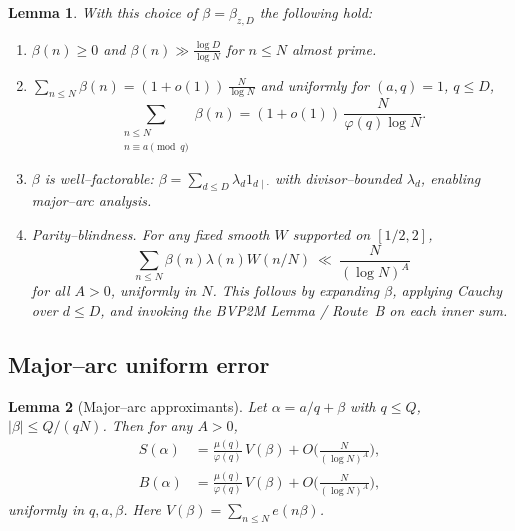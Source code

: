 \documentclass[11pt]{article}
\newtheorem{lemma}{Lemma}[part]
\theoremstyle{definition}
\theoremstyle{remark}
\numberwithin{equation}{part}
\begin{document}
\begin{lemma}\label{lem:beta-properties}
	With this choice of $\beta=\beta_{z,D}$ the following hold:
	\begin{enumerate}[label=(B\arabic*)]
		\item $\beta(n)\ge 0$ and $\beta(n)\gg \frac{\log D}{\log N}$ for $n\le N$ almost prime.
		\item $\sum_{n\le N}\beta(n)=(1+o(1))\,\tfrac{N}{\log N}$ and uniformly for $(a,q)=1$, $q\le D$,
		      \[
			      \sum_{\substack{n\le N\\ n\equiv a\pmod q}}\beta(n)
			      =(1+o(1))\,\frac{N}{\varphi(q)\log N}.
		      \]
		\item $\beta$ is well--factorable: $\beta=\sum_{d\le D}\lambda_d 1_{d\mid\cdot}$ with divisor--bounded $\lambda_d$, enabling major--arc analysis.
		\item \emph{Parity--blindness.} For any fixed smooth $W$ supported on $[1/2,2]$,
		      \[
			      \sum_{n\le N}\beta(n)\lambda(n)W(n/N)
			      \ \ll\ \frac{N}{(\log N)^A}
		      \]
		      for all $A>0$, uniformly in $N$. This follows by expanding $\beta$, applying Cauchy over $d\le D$, and invoking the BVP2M Lemma / Route~B on each inner sum.
	\end{enumerate}
\end{lemma}

\subsection{Major--arc uniform error}

\begin{lemma}[Major--arc approximants]\label{lem:major-errors}
	Let $\alpha=a/q+\beta$ with $q\le Q$, $|\beta|\le Q/(qN)$. Then for any $A>0$,
	\begin{align*}
		S(\alpha) & =\frac{\mu(q)}{\varphi(q)}\,V(\beta)+O\!\Big(\frac{N}{(\log N)^A}\Big), \\
		B(\alpha) & =\frac{\mu(q)}{\varphi(q)}\,V(\beta)+O\!\Big(\frac{N}{(\log N)^A}\Big),
	\end{align*}
	uniformly in $q,a,\beta$. Here $V(\beta)=\sum_{n\le N}e(n\beta)$.
\end{lemma}
\end{document}
